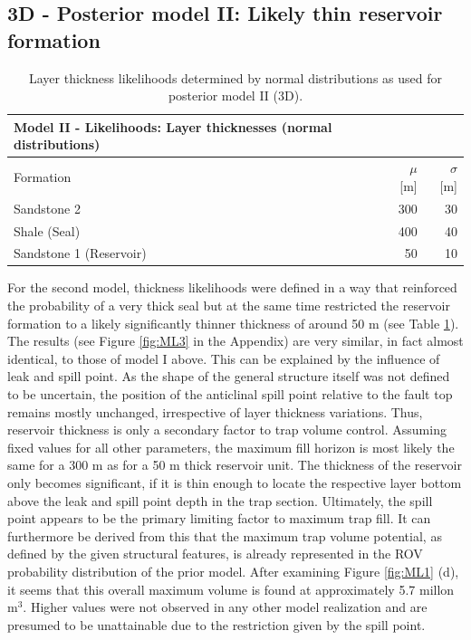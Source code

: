 		\subsection{3D - Posterior model II: Likely thin reservoir formation}%
		\begin{table}[h]
			\centering
			\begin{tabular}{lrr} 
				\toprule
				Model II - Likelihoods: Layer thicknesses (normal distributions)\\  
				\midrule 
				Formation & $\mu$ [m] & $\sigma$ [m]\\ 
				\midrule 
				Sandstone 2 & 300 & 30 \\
				Shale (Seal) & 400 & 40\\ 
				Sandstone 1 (Reservoir) & 50 & 10 \\
				\bottomrule
			\end{tabular}
			\caption{Layer thickness likelihoods determined by normal distributions as used for posterior model II (3D).}
			\label{tab:ML3_likelihoods}
		\end{table}
		For the second model, thickness likelihoods were defined in a way that reinforced the probability of a very thick seal but at the same time restricted the reservoir formation to a likely significantly thinner thickness of around 50 m (see Table \ref{tab:ML3_likelihoods}). The results (see Figure \ref{fig:ML3} in the Appendix) are very similar, in fact almost identical, to those of model I above. This can be explained by the influence of leak and spill point. As the shape of the general structure itself was not defined to be uncertain, the position of the anticlinal spill point relative to the fault top remains mostly unchanged, irrespective of layer thickness variations. Thus, reservoir thickness is only a secondary factor to trap volume control. Assuming fixed values for all other parameters, the maximum fill horizon is most likely the same for a 300 m as for a 50 m thick reservoir unit. The thickness of the reservoir only becomes significant, if it is thin enough to locate the respective layer bottom above the leak and spill point depth in the trap section. Ultimately, the spill point appears to be the primary limiting factor to maximum trap fill. It can furthermore be derived from this that the maximum trap volume potential, as defined by the given structural features, is already represented in the ROV probability distribution of the prior model. After examining Figure \ref{fig:ML1} (d), it seems that this overall maximum volume is found at approximately 5.7 millon m$^3$. Higher values were not observed in any other model realization and are presumed to be unattainable due to the restriction given by the spill point.
	
